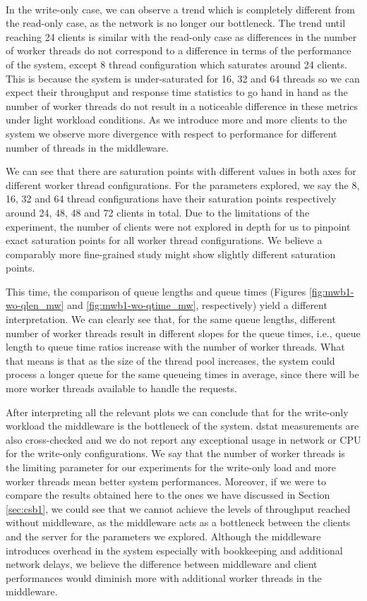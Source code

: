 \documentclass[11pt,a4paper]{article}
\begin{document}
\\
\par In the write-only case, we can observe a trend which is completely different from the read-only case, as the network is no longer our bottleneck. The trend until reaching 24 clients is similar with the read-only case as differences in the number of worker threads do not correspond to a difference in terms of the performance of the system, except 8 thread configuration which saturates around 24 clients. This is because the system is under-saturated for 16, 32 and 64 threads so we can expect their throughput and response time statistics to go hand in hand as the number of worker threads do not result in a noticeable difference in these metrics under light workload conditions. As we introduce more and more clients to the system we observe more divergence with respect to performance for different number of threads in the middleware.
\par We can see that there are saturation points with different values in both axes for different worker thread configurations. For the parameters explored, we say the 8, 16, 32 and 64 thread configurations have their saturation points respectively around 24, 48, 48 and 72 clients in total. Due to the limitations of the experiment, the number of clients were not explored in depth for us to pinpoint exact saturation points for all worker thread configurations. We believe a comparably more fine-grained study might show slightly different saturation points.
\par This time, the comparison of queue lengths and queue times (Figures \ref{fig:mwb1-wo-qlen_mw} and \ref{fig:mwb1-wo-qtime_mw}, respectively) yield a different interpretation. We can clearly see that, for the same queue lengths, different number of worker threads result in different slopes for the queue times, i.e., queue length to queue time ratios increase with the number of worker threads. What that means is that as the size of the thread pool increases, the system could process a longer queue for the same queueing times in average, since there will be more worker threads available to handle the requests.
\par After interpreting all the relevant plots we can conclude that for the write-only workload the middleware is the bottleneck of the system. dstat measurements are also cross-checked and we do not report any exceptional usage in network or CPU for the write-only configurations. We say that the number of worker threads is the limiting parameter for our experiments for the write-only load and more worker threads mean better system performances. Moreover, if we were to compare the results obtained here to the ones we have discussed in Section \ref{sec:csb1}, we could see that we cannot achieve the levels of throughput reached without middleware, as the middleware acts as a bottleneck between the clients and the server for the parameters we explored. Although the middleware introduces overhead in the system especially with bookkeeping and additional network delays, we believe the difference between middleware and client performances would diminish more with additional worker threads in the middleware.
\end{document}
